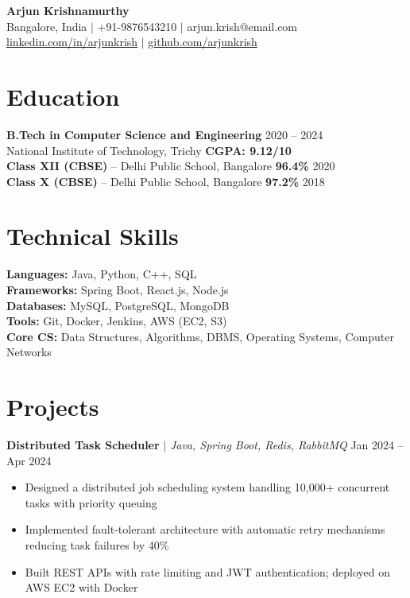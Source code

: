 \documentclass[10pt,a4paper]{article}
\begin{document}
\begin{center}
{\Large\bfseries Arjun Krishnamurthy}\\[4pt]
{\small Bangalore, India $\mid$ +91-9876543210 $\mid$ arjun.krish@email.com}\\
{\small \href{https://linkedin.com/in/arjunkrish}{linkedin.com/in/arjunkrish} $\mid$ \href{https://github.com/arjunkrish}{github.com/arjunkrish}}
\end{center}

\section{Education}

\textbf{B.Tech in Computer Science and Engineering} \hfill 2020 -- 2024\\
National Institute of Technology, Trichy \hfill \textbf{CGPA: 9.12/10}\\[3pt]
\textbf{Class XII (CBSE)} -- Delhi Public School, Bangalore \hfill \textbf{96.4\%} \hfill 2020\\
\textbf{Class X (CBSE)} -- Delhi Public School, Bangalore \hfill \textbf{97.2\%} \hfill 2018

\section{Technical Skills}

\textbf{Languages:} Java, Python, C++, SQL\\
\textbf{Frameworks:} Spring Boot, React.js, Node.js\\
\textbf{Databases:} MySQL, PostgreSQL, MongoDB\\
\textbf{Tools:} Git, Docker, Jenkins, AWS (EC2, S3)\\
\textbf{Core CS:} Data Structures, Algorithms, DBMS, Operating Systems, Computer Networks

\section{Projects}

\textbf{Distributed Task Scheduler} $\mid$ \textit{Java, Spring Boot, Redis, RabbitMQ} \hfill Jan 2024 -- Apr 2024
\begin{itemize}
    \item Designed a distributed job scheduling system handling 10,000+ concurrent tasks with priority queuing
    \item Implemented fault-tolerant architecture with automatic retry mechanisms reducing task failures by 40\%
    \item Built REST APIs with rate limiting and JWT authentication; deployed on AWS EC2 with Docker
\end{itemize}
\end{document}

